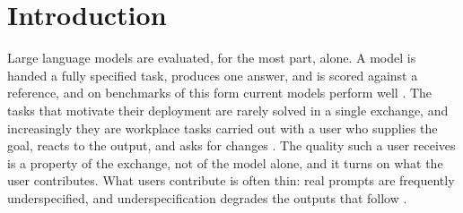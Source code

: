 %

\section{Introduction}

Large language models are evaluated, for the most part, alone. A model is handed a fully
specified task, produces one answer, and is scored against a reference, and on benchmarks of this form current models perform well \cite{liang2023holistic}. The tasks
that motivate their deployment are rarely solved in a single exchange, and increasingly they are workplace tasks carried out with a user who supplies the goal, reacts to the output,
and asks for changes \cite{anthropic2025economicindex, laban2025lost}. The quality such a
user receives is a property of the exchange, not of the model alone, and it turns on what
the user contributes. What users contribute is often thin: real prompts are
frequently underspecified, and underspecification degrades the outputs that follow
\cite{yang2025underspecification}.

